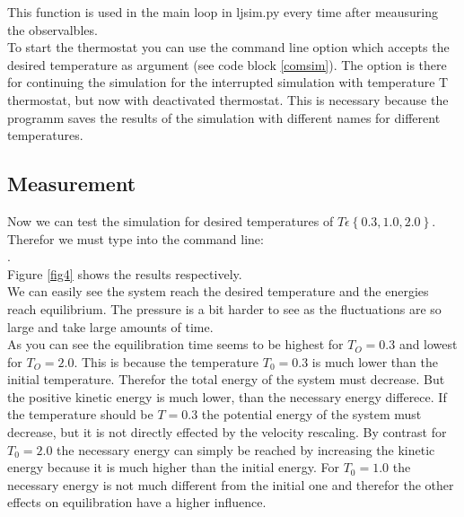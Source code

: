 
This function is used in the main loop in ljsim.py every time after meausuring the observalbles.\\

To start the thermostat you can use the command line option  which accepts the desired temperature as argument (see code block \ref{comsim}).
The option  is there for continuing the simulation for the interrupted simulation with temperature T thermostat, but now with deactivated thermostat.
This is necessary because the programm saves the results of the simulation with different names for different temperatures.

\subsection*{Measurement}

Now we can test the simulation for desired temperatures of  $T\epsilon\left\lbrace 0.3,1.0,2.0\right\rbrace $. 
Therefor we must type into the command line:\\

.\\


Figure \ref{fig4} shows the results respectively.\\

We can easily see the system reach the desired temperature and the energies reach equilibrium. The pressure is a bit harder to see as the fluctuations are so large and take large amounts of time.\\

As you can see the equilibration time seems to be highest for $T_O=0.3$ and lowest for $T_O=2.0$. 
This is because the temperature $T_0=0.3$ is much lower than the initial temperature. 
Therefor the total energy of the system must decrease. But the positive kinetic energy is much lower, than the necessary energy differece. 
If the temperature should be $T=0.3$ the potential energy of the system must decrease, but it is not directly effected by the velocity rescaling.
By contrast for $T_0=2.0$ the necessary energy can simply  be reached by increasing the kinetic energy because it is much higher than the initial energy.
For $T_0=1.0$ the necessary energy is not much different from the initial one and therefor the other effects on equilibration have a higher influence.

\FloatBarrier